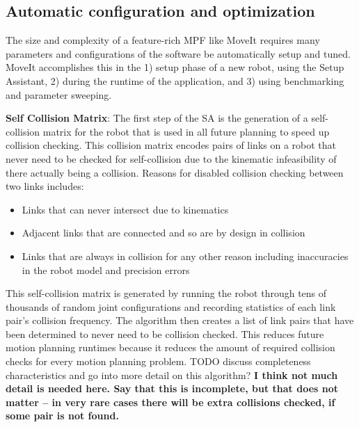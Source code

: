 \documentclass[10pt,journal,compsoc]{joser1}
\begin{document}
{%
\subsection{Automatic configuration and optimization}

The size and complexity of a feature-rich MPF like MoveIt requires many parameters and configurations of the software be automatically setup and tuned. MoveIt accomplishes this in the 1) setup phase of a new robot, using the Setup Assistant, 2) during the runtime of the application, and 3) using benchmarking and parameter sweeping.

{\bf Self Collision Matrix}: The first step of the SA is the generation of a self-collision matrix for the robot that is used in all future planning to speed up collision checking. This collision matrix encodes pairs of links on a robot that never need to be checked for self-collision due to the kinematic infeasibility of there actually being a collision. Reasons for disabled collision checking between two links includes:
 
\begin{itemize}
    \item Links that can never intersect due to kinematics
    \item Adjacent links that are connected and so are by design in collision
    \item Links that are always in collision for any other reason including inaccuracies in the robot model and precision errors
\end{itemize}

This self-collision matrix is generated by running the robot through tens of thousands of random joint configurations and recording statistics of each link pair's collision frequency. The algorithm then creates a list of link pairs that have been determined to never need to be collision checked. This reduces future motion planning runtimes because it reduces the amount of required collision checks for every motion planning problem. TODO discuss completeness characteristics and go into more detail on this algorithm?
\textbf{I think not much detail is needed here. Say that this is incomplete, but that does not matter -- in very rare cases there will be extra collisions checked, if some pair is not found.}

}
\end{document}
